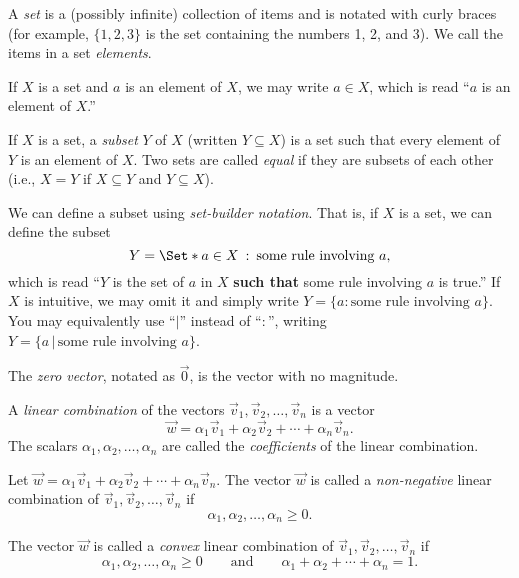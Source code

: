 \begin{SaveDefinition}[key=Set, title={Set}]
	A \emph{set} is a (possibly infinite) collection of items and is notated
	with curly braces (for example, $\{1,2,3\}$ is the set containing the
	numbers 1, 2, and 3). We call the items in a set
	\emph{elements}.

	If $X$ is a set and $a$ is an element of $X$, we may write $a\in X$,
	which is read ``$a$ is an element of $X$.''

	If $X$ is a set, a
	\emph{subset} $Y$ of $X$ (written $Y\subseteq X$) is a set such that
	every element of $Y$ is an element of $X$. Two sets are called
	\emph{equal} if they are subsets of each other (i.e., $X=Y$ if $X\subseteq
	Y$ and $Y\subseteq X$).

	We can define a subset using
	\emph{set-builder notation}. That is, if $X$ is a set, we can define the
	subset
	\[
		Y= \Set*{a\in X \given \text{some rule involving }a},
	\]
	 which is read ``$Y$ is the set of $a$ in $X$ {\bf such that} some rule
	involving $a$ is true.'' If $X$ is intuitive, we may omit it and simply write
	$Y=\{a:\text{some rule involving }a\}$. You may equivalently use ``$|$''
	instead of ``$:$'', writing $Y=\{a\,|\,\text{some rule involving }a\}$.
\end{SaveDefinition}

\begin{SaveDefinition}[key=ZeroVector, title={Zero Vector}]
		The \emph{zero vector}, notated as $\vec 0$,
		is the vector with no magnitude.
\end{SaveDefinition}

\begin{SaveDefinition}[key=LinearCombination, title={Linear Combination}]
	A \emph{linear combination} of the vectors
	$\vec v_{1},\vec v_{2},\ldots,\vec v_{n}$ is a vector
	\[
		\vec w = \alpha_{1}\vec v_{1}+\alpha_{2}\vec v_{2}+\cdots+\alpha_{n}\vec
		v_{n}.
	\]
	 The scalars $\alpha_{1},\alpha_{2},\ldots,\alpha_{n}$ are called the
	\emph{coefficients} of the linear combination.
\end{SaveDefinition}

\begin{SaveDefinition}[
	key=NonnegativeConvexLinearCombinations,
	title={Non-negative \& Convex Linear Combinations}]

	Let
	$\vec w=\alpha_{1}\vec v_{1}+\alpha_{2}\vec v_{2}+\cdots+\alpha_{n}\vec
	v_{n}.$
	The vector $\vec w$ is called a 
	\emph{non-negative} linear combination of
	$\vec v_{1},\vec v_{2},\ldots,\vec v_{n}$ if
	\[\alpha_{1},\alpha_{2},\ldots,\alpha_{n}\geq 0.\]

	The vector $\vec w$ is called a 
	\emph{convex} linear combination of
	$\vec v_{1},\vec v_{2},\ldots,\vec v_{n}$
	if \[\alpha_{1},\alpha_{2},\ldots,\alpha_{n}\geq 0\qquad\text{and}\qquad
	\alpha_{1}+\alpha_{2}+\cdots+\alpha_{n}=1.\]
\end{SaveDefinition}

